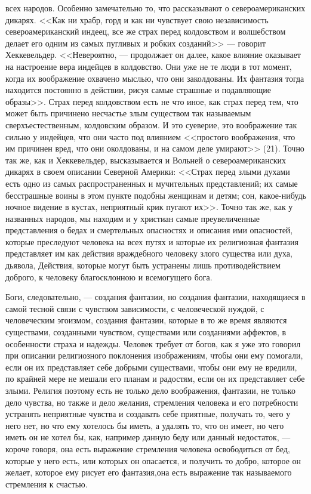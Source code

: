 \documentclass[12pt]{article}
\begin{document}
всех народов. Особенно замечательно то, что рассказывают о североамериканских дикарях. <<Как ни храбр, горд и как ни чувствует свою независимость североамериканский индеец, все же страх перед колдовством и волшебством делает его одним из самых пугливых и робких созданий>>  --- говорит Хеккевельдер. <<Невероятно, --- продолжает он далее, какое влияние оказывает на настроение вера индейцев в колдовство. Они уже не те люди в тот момент, когда их воображение охвачено мыслью, что они заколдованы. Их фантазия тогда находится постоянно в действии, рисуя самые страшные и подавляющие образы>>. Страх перед колдовством есть не что иное, как страх перед тем, что может быть причинено несчастье злым существом так называемым сверхъестественным, колдовским образом. И это суеверие, это воображение так сильно у индейцев, что они часто под влиянием <<простого воображения, что им причинен вред, что они околдованы, и на самом деле умирают>> (21). Точно так же, как и Хеккевельдер, высказывается и Вольней о североамериканских дикарях в своем описании Северной Америки: <<Страх перед злыми духами есть одно из самых распространенных и мучительных представлений; их самые бесстрашные воины в этом пункте подобны женщинам и детям; сон, какое-нибудь ночное видение в кустах, неприятный крик пугают их>>. Точно так же, как у названных народов, мы находим и у христиан самые преувеличенные представления о бедах и смертельных опасностях и описания ими опасностей, которые преследуют человека на всех путях и которые их религиозная фантазия представляет им как действия враждебного человеку злого существа или духа, дьявола, Действия, которые могут быть устранены лишь противодействием доброго, к человеку благосклонною и всемогущего бога. 

Боги, следовательно, --- создания фантазии, но создания фантазии, находящиеся в самой тесной связи с чувством зависимости, с человеческой нуждой, с человеческим эгоизмом, создания фантазии, которые в то же время являются существами, созданными чувством, существами или созданиями аффектов, в особенности страха и надежды. Человек требует от богов, как я уже это говорил при описании религиозного поклонения изображениям, чтобы они ему помогали, если он их представляет себе добрыми существами, чтобы они ему не вредили, по крайней мере не мешали его планам и радостям, если он их представляет себе злыми. Религия поэтому есть не только дело воображения, фантазии, не только дело чувства, но также и дело желания, стремления человека и его потребности устранять неприятные чувства и создавать себе приятные, получать то, чего у него нет, но что ему хотелось бы иметь, а удалять то, что он имеет, но чего иметь он не хотел бы, как, например данную беду или данный недостаток, --- короче говоря, она есть выражение стремления человека освободиться от бед, которые у него есть, или которых он опасается, и получить то добро, которое он желает, которое ему рисует его фантазия,она есть выражение так называемого стремления к счастью. 
\end{document}
